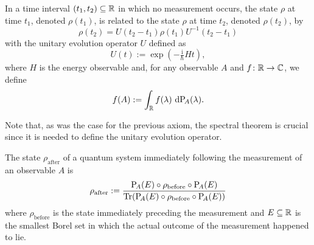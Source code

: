 \begin{tcolorbox}[colframe=blue!10!black,before skip=10pt]
\begin{axiom}
In a time interval $(t_1,t_2)\subseteq \mathbb{R}$ in which no measurement occurs, the state $\rho$ at time $t_1$, denoted $\rho(t_1)$, is related to the state $\rho$ at time $t_2$, denoted $\rho(t_2)$, by
\begin{equation*}
\rho(t_2) = U(t_2-t_1)\rho(t_1) U^{-1}(t_2-t_1)
\end{equation*}
with the unitary evolution operator $U$ defined as
\begin{equation*}
U(t) := \exp(-\tfrac{\mathrm{i}}{\hbar}Ht),
\end{equation*}
where $H$ is the energy observable and, for any observable $A$ and $f\colon \mathbb{R}\to \mathbb{C}$, we define
\begin{equation*}
f(A):=\int_{\mathbb{R}} f(\lambda) \, \mathop{}\!\mathrm{d} \mathrm{P}_{\!A}(\lambda).
\end{equation*}
\end{axiom}
\end{tcolorbox}
Note that, as was the case for the previous axiom, the spectral theorem is crucial since it is needed to define  the unitary evolution operator.

\begin{tcolorbox}[colframe=blue!10!black,before skip=10pt]
\begin{axiom}
The state $\rho_{\mathrm{after}}$ of a quantum system immediately following the measurement of an observable $A$ is
\begin{equation*}
\rho_{\mathrm{after}} := \frac{\mathrm{P}_{\!A}(E)\circ\rho_{\mathrm{before}}\circ\mathrm{P}_{\!A}(E)}{\operatorname{Tr}(\mathrm{P}_{\!A}(E)\circ\rho_{\mathrm{before}}\circ\mathrm{P}_{\!A}(E))}
\end{equation*}
where $\rho_{\mathrm{before}}$ is the state immediately preceding the measurement and $E\subseteq\mathbb{R}$ is the smallest Borel set in which the actual outcome of the measurement happened to lie.
\end{axiom}
\end{tcolorbox}























